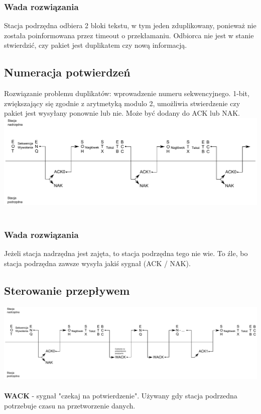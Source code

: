 \documentclass[a4paper,twoside]{article}
\begin{document}
	\subsubsection{Wada rozwiązania}
	Stacja podrzędna odbiera 2 bloki tekstu, w tym jeden zduplikowany, ponieważ nie została poinformowana przez timeout o przekłamaniu. Odbiorca nie jest w stanie stwierdzić, czy pakiet jest duplikatem czy nową informacją.
	\subsection{Numeracja potwierdzeń}
	Rozwiązanie problemu duplikatów: wprowadzenie numeru sekwencyjnego. 1-bit, zwiększający się zgodnie z arytmetyką modulo 2, umożliwia stwierdzenie czy pakiet jest wysyłany ponownie lub nie. Może być dodany do ACK lub NAK.\\
	\includegraphics[width=14cm]{./images/image09.pdf}\\\\
	\subsubsection{Wada rozwiązania}
	Jeżeli stacja nadrzędna jest zajęta, to stacja podrzędna tego nie wie. To źle, bo stacja podrzędna zawsze wysyła jakiś sygnał (ACK / NAK).
	\subsection{Sterowanie przepływem}
	\includegraphics[width=14cm]{./images/image10.pdf}\\\\
	\textbf{WACK} - sygnał "czekaj na potwierdzenie". Używany gdy stacja podrzedna potrzebuje czasu na przetworzenie danych.
\end{document}
